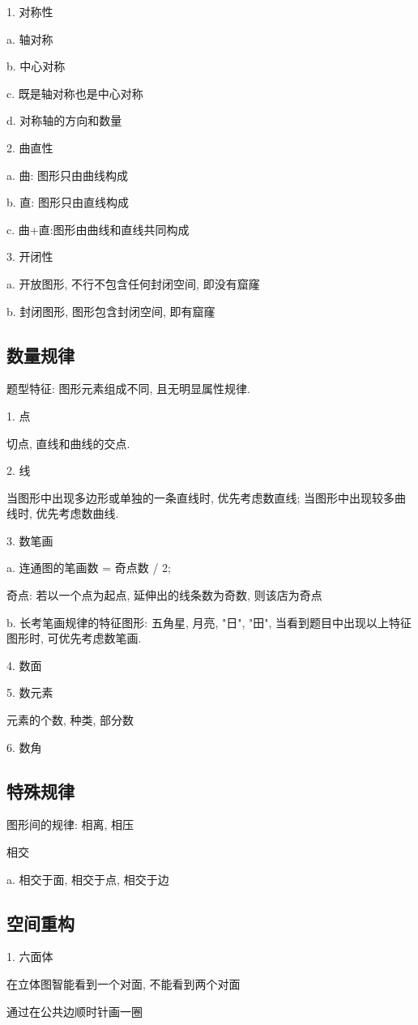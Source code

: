 \documentclass[UTF8]{ctexart}
\begin{document}
1. 对称性

a. 轴对称

b. 中心对称

c. 既是轴对称也是中心对称

d. 对称轴的方向和数量

2. 曲直性

a. 曲: 图形只由曲线构成

b. 直: 图形只由直线构成

c. 曲+直:图形由曲线和直线共同构成

3. 开闭性

a. 开放图形, 不行不包含任何封闭空间, 即没有窟窿

b. 封闭图形, 图形包含封闭空间, 即有窟窿


\subsection{数量规律}
题型特征: 图形元素组成不同, 且无明显属性规律.

1. 点

切点, 直线和曲线的交点.

2. 线

当图形中出现多边形或单独的一条直线时, 优先考虑数直线; 当图形中出现较多曲线时, 优先考虑数曲线.

3. 数笔画

a. 连通图的笔画数 = 奇点数 / 2;

奇点: 若以一个点为起点, 延伸出的线条数为奇数, 则该店为奇点

b. 长考笔画规律的特征图形: 五角星, 月亮, "日", "田", 当看到题目中出现以上特征图形时, 可优先考虑数笔画.

4. 数面

5. 数元素

元素的个数, 种类, 部分数

6. 数角
\subsection{特殊规律}

图形间的规律: 相离, 相压

相交

a. 相交于面, 相交于点, 相交于边

\subsection{空间重构}
1. 六面体

在立体图智能看到一个对面, 不能看到两个对面

通过在公共边顺时针画一圈
\end{document}
